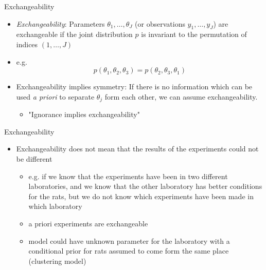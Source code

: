 \documentclass[finnish,english,t]{beamer}
\begin{document}
\begin{frame}{Exchangeability}

  \begin{itemize}
  \item \textit{Exchangeability}: Parameters
    $\theta_1,\ldots,\theta_J$ (or observations $y_1,\ldots,y_J$) are
    exchangeable if the joint distribution $p$ is invariant to the
    permutation of indices $(1,\ldots,J)$
  \item e.g.
    \begin{equation*}
      p(\theta_1,\theta_2,\theta_3) = p(\theta_2,\theta_3,\theta_1)
    \end{equation*}

  \item Exchangeability implies symmetry: If there is no information
    which can be used \textit{a priori} to separate $\theta_j$ form
    each other, we can assume exchangeability.
    \begin{itemize}
    \item "Ignorance implies
      exchangeability"
    \end{itemize}
  \end{itemize}
\end{frame}


\begin{frame}{Exchangeability}

  \begin{itemize}
  \item Exchangeability does not mean that the results of the
    experiments could not be different
    \begin{itemize}
    \item e.g. if we know that the experiments have been in two
      different laboratories, and we know that the other laboratory
      has better conditions for the rats, but we do not know which
      experiments have been made in which laboratory
    \item a priori experiments are exchangeable
    \item model could have unknown parameter for the laboratory with a
      conditional prior for rats assumed to come form the same place
      (clustering model)
    \end{itemize}
  \end{itemize}
\end{frame}
\end{document}
